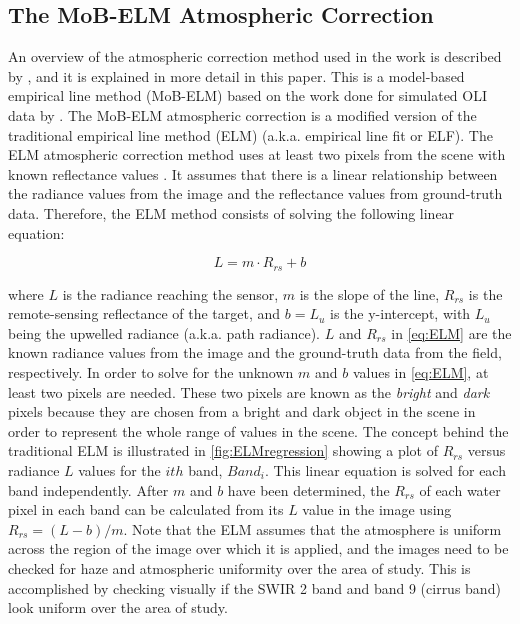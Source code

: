 \documentclass[onecolumn,3p,letterpaper]{elsarticle}
\begin{document}
\subsection{The MoB-ELM Atmospheric Correction}
An overview of the atmospheric correction method used in the work is described by \citet{Concha2014SPIE}, and it is explained in more detail in this paper. This is a model-based empirical line method (MoB-ELM) based on the work done for simulated OLI data by \citet{Gerace:2012}. The MoB-ELM atmospheric correction is a modified version of the traditional empirical line method (ELM) (a.k.a. empirical line fit or ELF). The ELM atmospheric correction method uses at least two pixels from the scene with known reflectance values \citep{Schott}. It assumes that there is a linear relationship between the radiance values from the image and the reflectance values from ground-truth data. Therefore, the ELM method consists of solving the following linear equation:

\begin{equation}\label{eq:ELM} 
	L = m\cdot R_{rs} + b
\end{equation}

\noindent where $L$ is the radiance reaching the sensor, $m$ is the slope of the line, $R_{rs}$ is the remote-sensing reflectance of the target, and $b=L_u$ is the y-intercept, with $L_u$ being the upwelled radiance (a.k.a. path radiance). $L$ and $R_{rs}$ in \autoref{eq:ELM} are the known radiance values from the image and the ground-truth data from the field, respectively. In order to solve for the unknown $m$ and $b$ values in \autoref{eq:ELM}, at least two pixels are needed. These two pixels are known as the {\it bright} and {\it dark} pixels because they are chosen from a bright and dark object in the scene in order to represent the whole range of values in the scene. The concept behind the traditional ELM is illustrated in \autoref{fig:ELMregression} showing a plot of $R_{rs}$ versus radiance $L$ values for the $ith$ band, $Band_{i}$. This linear equation is solved for each band independently. After $m$ and $b$ have been determined, the $R_{rs}$ of each water pixel in each band can be calculated from its $L$ value in the image using $R_{rs}=(L-b)/m$. Note that the ELM assumes that the atmosphere is uniform across the region of the image over which it is applied, and the images need to be checked for haze and atmospheric uniformity over the area of study. This is accomplished by checking visually if the SWIR 2 band and band 9 (cirrus band) look uniform over the area of study.
\end{document}
